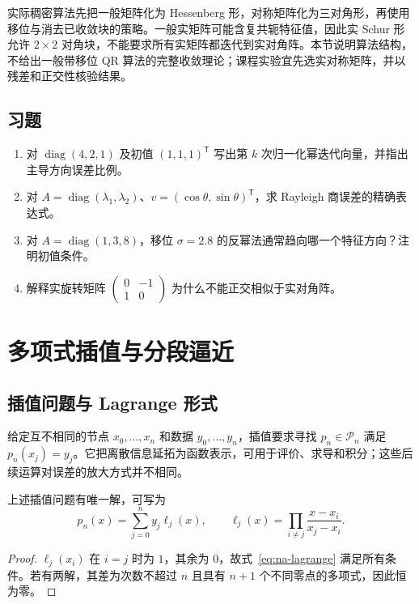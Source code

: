 \documentclass[UTF8,12pt,a4paper,fontset=fandol]{ctexbook}
\begin{document}
实际稠密算法先把一般矩阵化为 Hessenberg 形，对称矩阵化为三对角形，再使用移位与消去已收敛块的策略。一般实矩阵可能含复共轭特征值，因此实 Schur 形允许 $2\times2$ 对角块，不能要求所有实矩阵都迭代到实对角阵。本节说明算法结构，不给出一般带移位 QR 算法的完整收敛理论；课程实验宜先选实对称矩阵，并以残差和正交性核验结果。

\section{习题}
\begin{enumerate}[label=\arabic*.]
\item\label{exr:na-eigen-power} 对 $\operatorname{diag}(4,2,1)$ 及初值 $(1,1,1)^{\mathsf T}$ 写出第 $k$ 次归一化幂迭代向量，并指出主导方向误差比例。
\item\label{exr:na-eigen-rayleigh} 对 $A=\operatorname{diag}(\lambda_1,\lambda_2)$、$v=(\cos\theta,\sin\theta)^{\mathsf T}$，求 Rayleigh 商误差的精确表达式。
\item\label{exr:na-eigen-shift} 对 $A=\operatorname{diag}(1,3,8)$，移位 $\sigma=2.8$ 的反幂法通常趋向哪一个特征方向？注明初值条件。
\item\label{exr:na-eigen-rotation} 解释实旋转矩阵 $\begin{pmatrix}0&-1\\1&0\end{pmatrix}$ 为什么不能正交相似于实对角阵。
\end{enumerate}

\chapter{多项式插值与分段逼近}
\label{chap:na-interpolation}

\section{插值问题与 Lagrange 形式}
给定互不相同的节点 $x_0,\ldots,x_n$ 和数据 $y_0,\ldots,y_n$，插值要求寻找 $p_n\in\mathcal P_n$ 满足 $p_n(x_j)=y_j$。它把离散信息延拓为函数表示，可用于评价、求导和积分；这些后续运算对误差的放大方式并不相同。

\begin{theorem}[多项式插值的存在唯一性]
上述插值问题有唯一解，可写为
\begin{equation}
 p_n(x)=\sum_{j=0}^ny_j\ell_j(x),\qquad
 \ell_j(x)=\prod_{i\ne j}\frac{x-x_i}{x_j-x_i}.
 \label{eq:na-lagrange}
\end{equation}
\end{theorem}
\begin{proof}
$\ell_j(x_i)$ 在 $i=j$ 时为 $1$，其余为 $0$，故式~\eqref{eq:na-lagrange} 满足所有条件。若有两解，其差为次数不超过 $n$ 且具有 $n+1$ 个不同零点的多项式，因此恒为零。
\end{proof}
\end{document}
